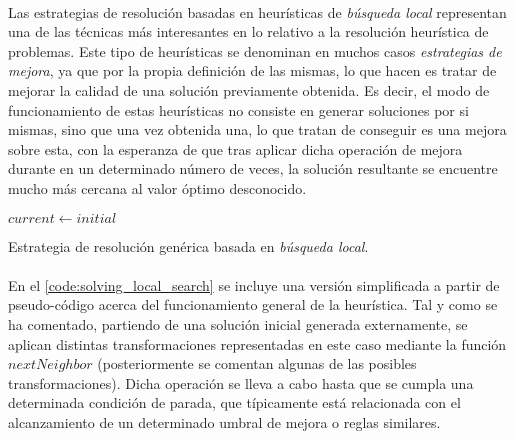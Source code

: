 \documentclass{subfiles}
\begin{document}
        \paragraph{}
        Las estrategias de resolución basadas en heurísticas de \emph{búsqueda local} representan una de las técnicas más interesantes en lo relativo a la resolución heurística de problemas. Este tipo de heurísticas se denominan en muchos casos \emph{estrategias de mejora}, ya que por la propia definición de las mismas, lo que hacen es tratar de mejorar la calidad de una solución previamente obtenida. Es decir, el modo de funcionamiento de estas heurísticas no consiste en generar soluciones por si mismas, sino que una vez obtenida una, lo que tratan de conseguir es una mejora sobre esta, con la esperanza de que tras aplicar dicha operación de mejora durante en un determinado número de veces, la solución resultante se encuentre mucho más cercana al valor óptimo desconocido.

        \begin{algorithm}[ht]
          \SetAlgoLined
          $current \gets initial$\;
          \caption{Estrategia de resolución genérica basada en \emph{búsqueda local}.}
          \label{code:solving_local_search}
        \end{algorithm}

        \paragraph{}
        En el \cref{code:solving_local_search} se incluye una versión simplificada a partir de pseudo-código acerca del funcionamiento general de la heurística. Tal y como se ha comentado, partiendo de una solución inicial generada externamente, se aplican distintas transformaciones representadas en este caso mediante la función $nextNeighbor$ (posteriormente se comentan algunas de las posibles transformaciones). Dicha operación se lleva a cabo hasta que se cumpla una determinada condición de parada, que típicamente está relacionada con el alcanzamiento de un determinado umbral de mejora o reglas similares.
\end{document}
